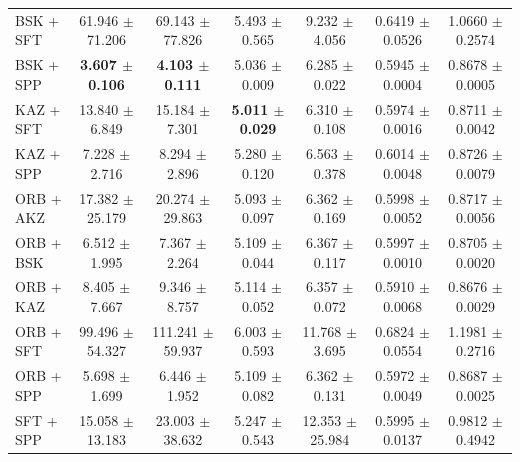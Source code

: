 \begin{table}[hbp]
\begin{tabular}{lcccccc}
BSK + SFT & 61.946 $\pm$ 71.206 & 69.143 $\pm$ 77.826 & 5.493 $\pm$ 0.565 & 9.232 $\pm$ 4.056 & 0.6419 $\pm$ 0.0526 & 1.0660 $\pm$ 0.2574 \\
BSK + SPP & \textbf{3.607 $\pm$ 0.106} & \textbf{4.103 $\pm$ 0.111} & 5.036 $\pm$ 0.009 & 6.285 $\pm$ 0.022 & 0.5945 $\pm$ 0.0004 & 0.8678 $\pm$ 0.0005 \\
KAZ + SFT & 13.840 $\pm$ 6.849 & 15.184 $\pm$ 7.301 & \textbf{5.011 $\pm$ 0.029} & 6.310 $\pm$ 0.108 & 0.5974 $\pm$ 0.0016 & 0.8711 $\pm$ 0.0042 \\
KAZ + SPP & 7.228 $\pm$ 2.716 & 8.294 $\pm$ 2.896 & 5.280 $\pm$ 0.120 & 6.563 $\pm$ 0.378 & 0.6014 $\pm$ 0.0048 & 0.8726 $\pm$ 0.0079 \\
ORB + AKZ & 17.382 $\pm$ 25.179 & 20.274 $\pm$ 29.863 & 5.093 $\pm$ 0.097 & 6.362 $\pm$ 0.169 & 0.5998 $\pm$ 0.0052 & 0.8717 $\pm$ 0.0056 \\
ORB + BSK & 6.512 $\pm$ 1.995 & 7.367 $\pm$ 2.264 & 5.109 $\pm$ 0.044 & 6.367 $\pm$ 0.117 & 0.5997 $\pm$ 0.0010 & 0.8705 $\pm$ 0.0020 \\
ORB + KAZ & 8.405 $\pm$ 7.667 & 9.346 $\pm$ 8.757 & 5.114 $\pm$ 0.052 & 6.357 $\pm$ 0.072 & 0.5910 $\pm$ 0.0068 & 0.8676 $\pm$ 0.0029 \\
ORB + SFT & 99.496 $\pm$ 54.327 & 111.241 $\pm$ 59.937 & 6.003 $\pm$ 0.593 & 11.768 $\pm$ 3.695 & 0.6824 $\pm$ 0.0554 & 1.1981 $\pm$ 0.2716 \\
ORB + SPP & 5.698 $\pm$ 1.699 & 6.446 $\pm$ 1.952 & 5.109 $\pm$ 0.082 & 6.362 $\pm$ 0.131 & 0.5972 $\pm$ 0.0049 & 0.8687 $\pm$ 0.0025 \\
SFT + SPP & 15.058 $\pm$ 13.183 & 23.003 $\pm$ 38.632 & 5.247 $\pm$ 0.543 & 12.353 $\pm$ 25.984 & 0.5995 $\pm$ 0.0137 & 0.9812 $\pm$ 0.4942 \\
\bottomrule
\end{tabular}
\end{table}